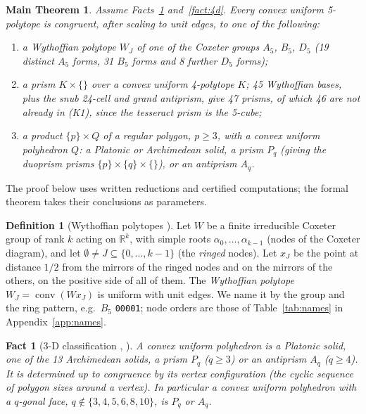 \documentclass[11pt]{article}
\newtheorem{fact}[theorem]{Fact}
\newtheorem*{maintheorem}{Main Theorem}
\theoremstyle{definition}
\newtheorem{definition}[theorem]{Definition}
\theoremstyle{remark}
\newcommand{\R}{\mathbb{R}}
\newcommand{\conv}{\operatorname{conv}}
\begin{document}
\begin{maintheorem}\label{thm:main}
Assume Facts~\ref{fact:3d} and~\ref{fact:4d}.
Every convex uniform 5-polytope is congruent, after scaling to unit edges,
to one of the following:
\begin{enumerate}[label=\textup{(K\arabic*)},leftmargin=3em]
\item a Wythoffian polytope $W_J$ of one of the Coxeter groups $A_5$,
  $B_5$, $D_5$ (19 distinct $A_5$ forms, 31 $B_5$ forms
  and 8 further $D_5$ forms);
\item a prism $K\times\{\}$ over a convex uniform 4-polytope $K$;
  45 Wythoffian bases, plus the snub 24-cell and grand antiprism, give 47
  prisms, of which 46 are not already in (K1), since the tesseract prism
  is the 5-cube;
\item a product $\{p\}\times Q$ of a regular polygon, $p\ge3$, with a
  convex uniform polyhedron $Q$: a Platonic or Archimedean solid, a prism
  $P_q$ (giving the \emph{duoprism prisms}
  $\{p\}\times\{q\}\times\{\}$), or an antiprism $A_q$.
\end{enumerate}
\end{maintheorem}
The proof below uses written reductions and certified computations; the formal theorem takes their conclusions as parameters.
\begin{definition}[Wythoffian polytopes {\cite{Wythoff1918,Coxeter1935}}]\label{def:wythoff}
Let $W$ be a finite irreducible Coxeter group of rank $k$ acting on
$\R^k$, with simple roots $\alpha_0,\dots,\alpha_{k-1}$ (nodes of the
Coxeter diagram), and let $\emptyset\ne J\subseteq\{0,\dots,k-1\}$ (the
\emph{ringed} nodes). Let $x_J$ be the point at distance $1/2$ from the
mirrors of the ringed nodes and on the mirrors of the others, on the
positive side of all of them. The \emph{Wythoffian polytope}
$W_J=\conv(W x_J)$ is uniform with unit edges. We name it by the group and
the ring pattern, e.g.\ $B_5$ \texttt{00001}; node orders are those of
Table~\ref{tab:names} in Appendix~\ref{app:names}.
\end{definition}
\begin{fact}[3-D classification {\cite[Section 18.5]{Schulte2017}, \cite{Grunbaum2009}}]\label{fact:3d}
A convex uniform polyhedron is a Platonic solid, one of the 13
Archimedean solids, a prism $P_q$ ($q\ge3$) or an antiprism $A_q$
($q\ge4$). It is determined up to congruence by its vertex configuration
(the cyclic sequence of polygon sizes around a vertex). In particular a
convex uniform polyhedron with a $q$-gonal face, $q\notin\{3,4,5,6,8,10\}$,
is $P_q$ or $A_q$.
\end{fact}
\end{document}
